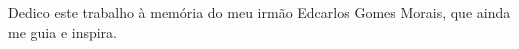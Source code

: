 
\begin{dedicatoria}
  \vspace*{\fill}
  \hfill
  \begin{minipage}{.5\textwidth}
    Dedico este trabalho à memória do meu irmão Edcarlos Gomes Morais, que ainda me guia e inspira.
  \end{minipage}
\end{dedicatoria}
